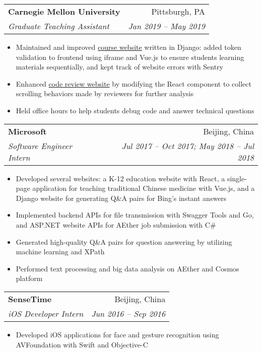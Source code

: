 \documentclass[letterpaper,11pt]{article}
\makeatletter
\newcommand{\resumeItemCustom}[1]{
  \item[$\bullet$]\small{
    #1 \vspace{-2pt}
  }
}
\newcommand{\resumeSubheading}[4]{
  \vspace{-1pt}\item[]
    \begin{tabular*}{0.97\textwidth}[t]{l@{\extracolsep{\fill}}r}
      \textbf{\small#1} & {\small#2} \\
      \textit{\small#3} & \textit{\small#4} \\
    \end{tabular*}\vspace{-5pt}
}
\newcommand{\resumeItemListStart}{\begin{itemize}}
\newcommand{\resumeItemListEnd}{\end{itemize}\vspace{-5pt}}
\makeatother
\begin{document}
    \resumeSubheading
      {Carnegie Mellon University}{Pittsburgh, PA}
      {Graduate Teaching Assistant}{Jan 2019 -- May 2019}
      \resumeItemListStart
        \resumeItemCustom{
          Maintained and improved \href{https://theproject.zone/}{course website} written in Django:
          added token validation to frontend using iframe and Vue.js to ensure 
          students learning materials sequentially, and kept track of website errors with Sentry
        }
        \resumeItemCustom{
          Enhanced \href{https://codereview.theproject.zone/}{code review website} by modifying the React component
          to collect scrolling behaviors made by reviewers for further analysis
        }
        \resumeItemCustom{
          Held office hours to help students debug code and answer technical questions
        }
      \resumeItemListEnd

    \resumeSubheading
      {Microsoft}{Beijing, China}
      {Software Engineer Intern}{Jul 2017 -- Oct 2017; May 2018 -- Jul 2018}
      \resumeItemListStart
        \resumeItemCustom{
          Developed several websites: a K-12 education website with React,
          a single-page application for teaching traditional Chinese medicine with Vue.js,
          and a Django website for generating Q\&A pairs for Bing's instant answers
        }
        \resumeItemCustom{
          Implemented backend APIs for file transmission with Swagger Tools and 
          Go, and ASP.NET website APIs for AEther job submission with C\#
        }
        \resumeItemCustom{
          Generated high-quality Q\&A pairs for question
          answering by utilizing machine learning and XPath
        }
        \resumeItemCustom{
          Performed text processing and big data analysis on AEther and Cosmos platform
        }
      \resumeItemListEnd

    \resumeSubheading
      {SenseTime}{Beijing, China}
      {iOS Developer Intern}{Jun 2016 -- Sep 2016}
      \resumeItemListStart
        \resumeItemCustom{
            Developed iOS applications for 
            face and gesture recognition using AVFoundation
            with Swift and Objective-C
        }
      \resumeItemListEnd
\end{document}

